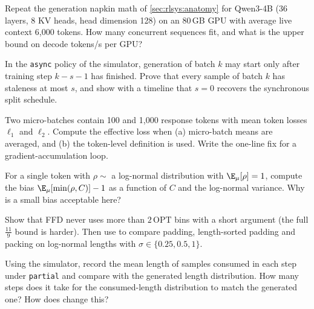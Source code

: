 \begin{exercise}[KV budget]
Repeat the generation napkin math of \cref{sec:rlsys:anatomy} for Qwen3-4B (36 layers, 8 KV
heads, head dimension 128) on an 80\,GB GPU with average live context 6{,}000 tokens. How many
concurrent sequences fit, and what is the upper bound on decode tokens/s per GPU?
\end{exercise}

\begin{exercise}
In the \texttt{async} policy of the simulator, generation of batch $k$ may start only after
training step $k-s-1$ has finished. Prove that every sample of batch $k$ has staleness at most
$s$, and show with a timeline that $s=0$ recovers the synchronous split schedule.
\end{exercise}

\begin{exercise}
Two micro-batches contain 100 and 1{,}000 response tokens with mean token losses $\ell_1$ and
$\ell_2$. Compute the effective loss when (a) micro-batch means are averaged, and (b) the
token-level definition is used. Write the one-line fix for a gradient-accumulation loop.
\end{exercise}

\begin{exercise}
For a single token with $\rho\sim$ a log-normal distribution with $\E_\mu[\rho]=1$, compute the
bias $\E_\mu[\min(\rho,C)]-1$ as a function of $C$ and the log-normal variance. Why is a
small bias acceptable here?
\end{exercise}

\begin{exercise}
Show that FFD never uses more than $2\,\mathrm{OPT}$ bins with a short argument (the full
$\tfrac{11}{9}$ bound is harder). Then use  to compare padding,
length-sorted padding and packing on log-normal lengths with $\sigma\in\{0.25,0.5,1\}$.
\end{exercise}

\begin{exercise}
Using the simulator, record the mean length of samples consumed in each step under
\texttt{partial} and compare with the generated length distribution. How many steps does it
take for the consumed-length distribution to match the generated one? How does
 change this?
\end{exercise}


